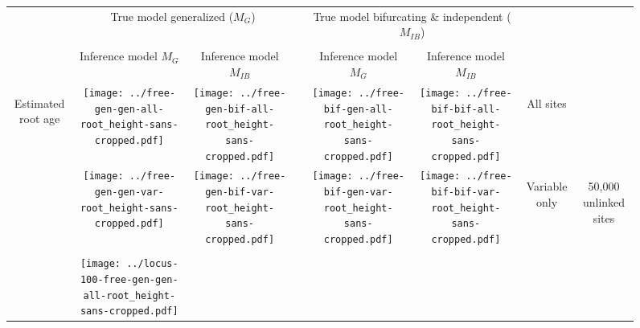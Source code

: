 \documentclass[border=10pt,varwidth=30cm]{standalone}
\newcommand{\genmodel}{\ensuremath{M_{G}}\xspace}
\newcommand{\bimodel}{\ensuremath{M_{IB}}\xspace}
\begin{document}
\begin{figure}
    \setlength\arrayrulewidth{2pt}
    \centering
    \begin{tabular}{@{}cccccccc@{}}
        & \multicolumn{2}{c}{\LARGE True model generalized (\genmodel)}
        &
        & \multicolumn{2}{c}{\LARGE True model bifurcating \& independent (\bimodel)}
        &
        & \\[1ex]
        \cline{2-3}\cline{5-6}
        & & & & & & & \\
        & \multirow{1}{0.19\textwidth}{\centering\Large Inference model \genmodel}
        & \multirow{1}{0.19\textwidth}{\centering\Large Inference model \bimodel}
        &
        & \multirow{1}{0.19\textwidth}{\centering\Large Inference model \genmodel}
        & \multirow{1}{0.19\textwidth}{\centering\Large Inference model \bimodel}
        &
        & \\[4ex]
        \multirow{5}{*}[-8em]{\begin{sideways}\Large Estimated root age\end{sideways}}
        & \texttt{[image: ../free-gen-gen-all-root\_height-sans-cropped.pdf]}
        & \texttt{[image: ../free-gen-bif-all-root\_height-sans-cropped.pdf]}
        &
        & \texttt{[image: ../free-bif-gen-all-root\_height-sans-cropped.pdf]}
        & \texttt{[image: ../free-bif-bif-all-root\_height-sans-cropped.pdf]}
        & \multicolumn{1}{c|}{\multirow{1}{*}[9em]{\begin{sideways}\Large All sites\end{sideways}}}
        & \\
        & \texttt{[image: ../free-gen-gen-var-root\_height-sans-cropped.pdf]}
        & \texttt{[image: ../free-gen-bif-var-root\_height-sans-cropped.pdf]}
        &
        & \texttt{[image: ../free-bif-gen-var-root\_height-sans-cropped.pdf]}
        & \texttt{[image: ../free-bif-bif-var-root\_height-sans-cropped.pdf]}
        & \multicolumn{1}{c|}{\multirow{1}{*}[10em]{\begin{sideways}\Large Variable only\end{sideways}}}
        & \multirow{2}{*}[19em]{\begin{sideways}\LARGE 50,000 unlinked sites\end{sideways}} \\
        & & & & & & & \\
        & \texttt{[image: ../locus-100-free-gen-gen-all-root\_height-sans-cropped.pdf]}

\end{tabular}
\end{figure}
\end{document}
